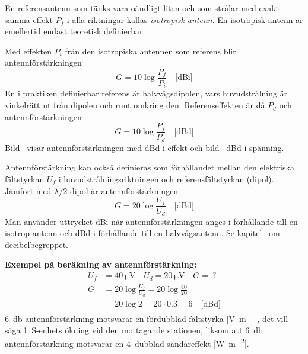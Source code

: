 En referensantenn som tänks vara oändligt liten och som strålar med exakt
samma effekt \(P_f\) i alla riktningar kallas \emph{isotropisk antenn}.
En isotropisk antenn är emellertid endast teoretisk definierbar.

Med effekten \(P_i\) från den isotropiska antennen som referens blir
antennförstärkningen
\[G = 10 \log\frac{P_f}{P_i} \quad \text{[dBi]}\]
En i praktiken definierbar referens är halvvågsdipolen, vars
huvudstrålning är vinkelrätt ut från dipolen och runt omkring den.
Referenseffekten är då \(P_d\) och antennförstärkningen
\[G = 10 \log\frac{P_f}{P_d} \quad \text{[dBd]}\] %
Bild~ visar antennförstärkningen med dBd i effekt och
bild~ dBd i spänning.



Antennförstärkning kan också definieras som förhållandet mellan den elektriska
fältstyrkan \(U_f\) i huvudstrålningsriktningen och referensfältstyrkan (dipol).
Jämfört med \(\lambda/2\)-dipol är antennförstärkningen
\[G = 20 \log\frac{U_f}{U_d} \quad \text{[dBd]}\] %
Man använder uttrycket dBi när antennförstärkningen anges i förhållande till
en isotrop antenn och dBd i förhållande till en halvvågsantenn.
Se kapitel~ om decibelbegreppet.

\vspace{1ex}
\noindent\textbf{Exempel på beräkning av antennförstärkning:}
\begin{align*}
  U_f &= \qty{40}{\micro\volt} \quad U_d = \qty{20}{\micro\volt} \quad G =\ ? \\
  G &= 20 \log\frac{U_f}{U_d} = 20 \log\frac{40}{20} \\
  &= 20 \log 2 = 20\cdot 0.3 = 6 \quad \text{[dBd]}
\end{align*}
\qty{6}{\decibel} antennförstärkning motsvarar en fördubblad fältstyrka
[\unit{\volt\per\metre}], det vill säga 1~S-enhets ökning vid den mottagande
stationen, liksom att \qty{6}{\decibel} antennförstärkning motsvarar en 4~dubblad
sändareffekt [\unit{\watt\per\square\metre}].

